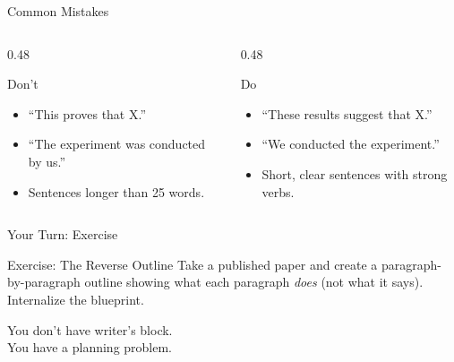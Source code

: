 \documentclass[aspectratio=169]{beamer}
\begin{document}
\begin{frame}{Common Mistakes}
  \begin{columns}[T]
    \begin{column}{0.48\textwidth}
      \begin{alertblock}{Don't}
        \begin{itemize}
          \item ``This proves that X.''
          \item ``The experiment was conducted by us.''
          \item Sentences longer than 25 words.
        \end{itemize}
      \end{alertblock}
    \end{column}
    \begin{column}{0.48\textwidth}
      \begin{exampleblock}{Do}
        \begin{itemize}
          \item ``These results suggest that X.''
          \item ``We conducted the experiment.''
          \item Short, clear sentences with strong verbs.
        \end{itemize}
      \end{exampleblock}
    \end{column}
  \end{columns}
\end{frame}

\begin{frame}{Your Turn: Exercise}
  \begin{exampleblock}{Exercise: The Reverse Outline}
    Take a published paper and create a paragraph-by-paragraph outline showing what each paragraph \textit{does} (not what it says). Internalize the blueprint.
  \end{exampleblock}
\end{frame}

\begin{frame}[standout]
  You don't have writer's block.\\
  You have a planning problem.
\end{frame}
\end{document}
